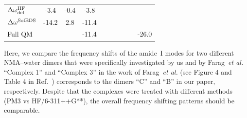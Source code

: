 \documentclass[b5paper,oneside,fleqn,11pt]{book}
\begin{document}
\begin{refsection}
\begin{table}
\begin{tabular*}{1.0\textwidth}{@{\extracolsep{\fill} } lccccccccc}
 $\Delta\omega^{\rm HF}_{\rm del}$    
          &  -3.4 & -0.4  &  -3.8 && & & & &       \\
 $\Delta\omega^{\rm SolEDS}$    
          & -14.2 &  2.8  & -11.4 && & & & &       \\
 Full QM  &       &       & -11.4 && & & & & -26.0 \\
%
\hline\hline
\end{tabular*}
\end{table}
%
Here, we compare the frequency shifts of the amide~I modes for two different 
NMA--water dimers that were specifically investigated by us and by Farag~\emph{et al.} 
``Complex 1'' and ``Complex 3'' in the work of Farag~\emph{et al.} 
(see Figure 4 and Table 4 in Ref.~\citep{Farag.Ruiz-Lopez.Bastida.Monard.Ingrosso.JPCB.2015}) 
corresponds to the dimers ``C'' and ``B'' 
in our paper, respectively. Despite that the complexes were treated 
with different methods (PM3 vs HF/6-311++G**), the overall frequency shifting 
patterns should be comparable. 


\end{refsection}
\end{document}
